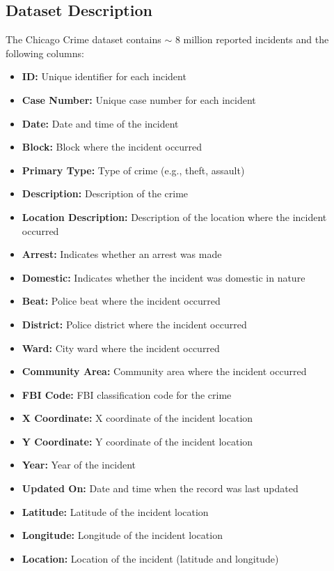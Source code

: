 \documentclass{article}
\begin{document}
\subsection{Dataset Description}
The Chicago Crime dataset contains $\sim$ 8 million reported incidents and the following columns:
\begin{itemize}[leftmargin=2em]
    \item \textbf{ID:} Unique identifier for each incident
    \item \textbf{Case Number:} Unique case number for each incident
    \item \textbf{Date:} Date and time of the incident
    \item \textbf{Block:} Block where the incident occurred
    \item \textbf{Primary Type:} Type of crime (e.g., theft, assault)
    \item \textbf{Description:} Description of the crime
    \item \textbf{Location Description:} Description of the location where the incident occurred
    \item \textbf{Arrest:} Indicates whether an arrest was made
    \item \textbf{Domestic:} Indicates whether the incident was domestic in nature
    \item \textbf{Beat:} Police beat where the incident occurred
    \item \textbf{District:} Police district where the incident occurred
    \item \textbf{Ward:} City ward where the incident occurred
    \item \textbf{Community Area:} Community area where the incident occurred
    \item \textbf{FBI Code:} FBI classification code for the crime
    \item \textbf{X Coordinate:} X coordinate of the incident location
    \item \textbf{Y Coordinate:} Y coordinate of the incident location
    \item \textbf{Year:} Year of the incident
    \item \textbf{Updated On:} Date and time when the record was last updated
    \item \textbf{Latitude:} Latitude of the incident location
    \item \textbf{Longitude:} Longitude of the incident location
    \item \textbf{Location:} Location of the incident (latitude and longitude)
\end{itemize}
\end{document}
